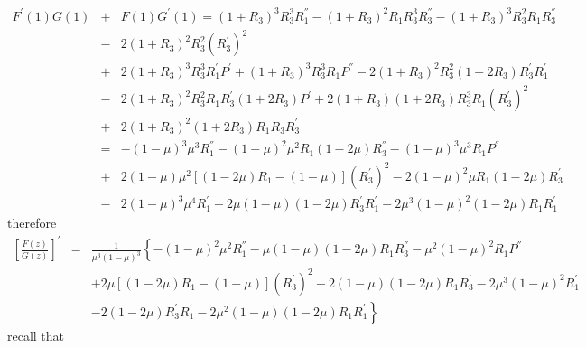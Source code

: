 \begin{eqnarray*}
F^{'}\left(1\right)G\left(1\right)&+&F\left(1\right)G^{'}\left(1\right)
=\left(1+R_{3}\right)^{3}R_{3}^{3}R_{1}^{''}-\left(1+R_{3}\right)^{2}R_{1}R_{3}^{3}R_{3}^{''}
-\left(1+R_{3}\right)^{3}R_{3}^{2}R_{1}R_{3}^{''}\\
&-&2\left(1+R_{3}\right)^{2}R_{3}^{2}
\left(R_{3}^{'}\right)^{2}\\
&+&2\left(1+R_{3}\right)^{3}R_{3}^{3}R_{1}^{'}P^{'}
+\left(1+R_{3}\right)^{3}R_{3}^{3}R_{1}P^{''}
-2\left(1+R_{3}\right)^{2}R_{3}^{2}\left(1+2R_{3}\right)R_{3}^{'}R_{1}^{'}\\
&-&2\left(1+R_{3}\right)^{2}R_{3}^{2}R_{1}R_{3}^{'}\left(1+2R_{3}\right)P^{'}
+2\left(1+R_{3}\right)\left(1+2R_{3}\right)R_{3}^{3}R_{1}\left(R_{3}^{'}\right)^{2}\\
&+&2\left(1+R_{3}\right)^{2}\left(1+2R_{3}\right)R_{1}R_{3}R_{3}^{'}\\
&=&-\left(1-\mu\right)^{3}\mu^{3}R_{1}^{''}-\left(1-\mu\right)^{2}\mu^{2}R_{1}\left(1-2\mu\right)R_{3}^{''}
-\left(1-\mu\right)^{3}\mu^{3}R_{1}P^{''}\\
&+&2\left(1-\mu\right)\mu^{2}\left[\left(1-2\mu\right)R_{1}-\left(1-\mu\right)\right]\left(R_{3}^{'}\right)^{2}
-2\left(1-\mu\right)^{2}\mu R_{1}\left(1-2\mu\right)R_{3}^{'}\\
&-&2\left(1-\mu\right)^{3}\mu^{4}R_{1}^{'}-2\mu\left(1-\mu\right)\left(1-2\mu\right)R_{3}^{'}R_{1}^{'}
-2\mu^{3}\left(1-\mu\right)^{2}\left(1-2\mu\right)R_{1}R_{1}^{'}
\end{eqnarray*}
therefore
\begin{eqnarray*}
\left[\frac{F\left(z\right)}{G\left(z\right)}\right]^{'}&=&\frac{1}{\mu^{3}\left(1-\mu\right)^{3}}\left\{
-\left(1-\mu\right)^{2}\mu^{2}R_{1}^{''}-\mu\left(1-\mu\right)\left(1-2\mu\right)R_{1}R_{3}^{''}
-\mu^{2}\left(1-\mu\right)^{2}R_{1}P^{''}\right.\\
&&\left.+2\mu\left[\left(1-2\mu\right)R_{1}-\left(1-\mu\right)\right]\left(R_{3}^{'}\right)^{2}
-2\left(1-\mu\right)\left(1-2\mu\right)R_{1}R_{3}^{'}-2\mu^{3}\left(1-\mu\right)^{2}R_{1}^{'}\right.\\
&&\left.-2\left(1-2\mu\right)R_{3}^{'}R_{1}^{'}-2\mu^{2}\left(1-\mu\right)\left(1-2\mu\right)R_{1}R_{1}^{'}\right\}
\end{eqnarray*}
recall that


